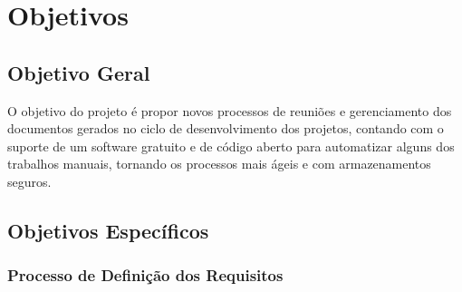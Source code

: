\chapter[Objetivos]{Objetivos}
\label{cp:objetivos}

\section{Objetivo Geral}

O objetivo do projeto é propor novos processos de reuniões e gerenciamento dos documentos gerados no ciclo de desenvolvimento dos projetos, contando com o suporte de um software gratuito e de código aberto para automatizar alguns dos trabalhos manuais, tornando os processos mais ágeis e com armazenamentos seguros.

\section{Objetivos Específicos}

\subsection{Processo de Definição dos Requisitos}